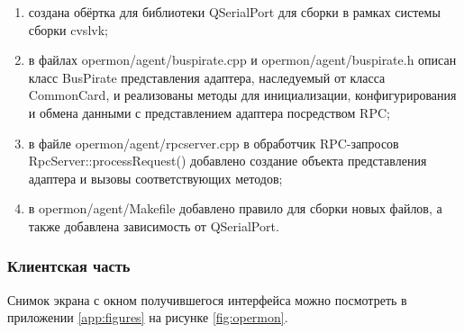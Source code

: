 \begin{enumerate}
 \item создана обёртка для библиотеки QSerialPort для сборки в рамках системы сборки cvslvk;
 \item в файлах opermon/agent/buspirate.cpp и opermon/agent/buspirate.h описан класс BusPirate представления адаптера, наследуемый от класса CommonCard, и реализованы методы для инициализации, конфигурирования и обмена данными с представлением адаптера посредством RPC;
 \item в файле opermon/agent/rpcserver.cpp в обработчик RPC-запросов RpcServer::processRequest() добавлено создание объекта представления адаптера и вызовы соответствующих методов;
 \item в opermon/agent/Makefile добавлено правило для сборки новых файлов, а также добавлена зависимость от QSerialPort.
\end{enumerate}


\subsubsection{Клиентская часть}

\label{client_implementation}




Снимок экрана с окном получившегося интерфейса можно посмотреть в приложении \ref{app:figures} на рисунке \ref{fig:opermon}.